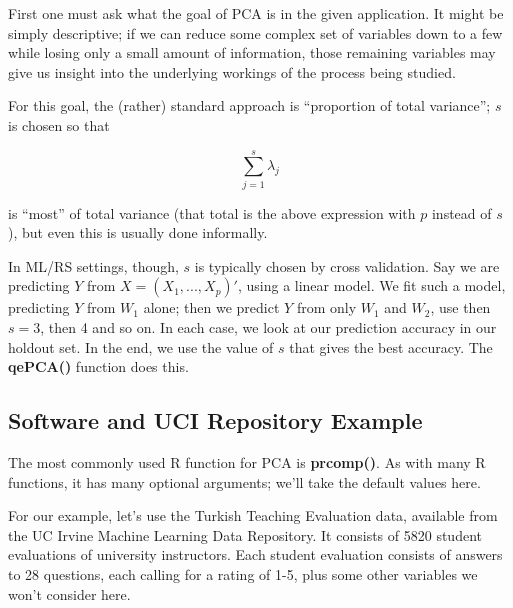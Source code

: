 First one must ask what the goal of PCA is in the given application.
It might be simply descriptive; if we can reduce some complex set of
variables down to a few while losing only a small amount of
information, those remaining variables may give us insight into the
underlying workings of the process being studied.

For this goal, the (rather) standard approach is ``proportion of total
variance''; $s$ is chosen so that 

\begin{equation} 
\sum_{j=1}^s \lambda_j
\end{equation}

is ``most'' of total variance (that total is the above expression
with $p$ instead of $s$), but even this is usually done informally.

In ML/RS settings, though, $s$ is typically chosen by 
cross validation.  Say we are predicting $Y$ from $X = (X_1,...,X_p)'$,
using a linear model.  We fit such a model, predicting $Y$
from $W_1$ alone; then we predict $Y$ from only $W_1$ and $W_2$,
use then $s = 3$, then 4 and so on.  In each case, we look at our
prediction accuracy in our holdout set.  In the end, we use the value of
$s$ that gives the best accuracy.  The \textbf{qePCA()} function does
this.


\subsection{Software and UCI Repository Example}

The most commonly used R function for PCA is \textbf{prcomp()}.  As with
many R functions, it has many optional arguments; we'll take the default
values here.

For our example, let's use the Turkish Teaching Evaluation data,
available from the UC Irvine Machine Learning Data Repository.  It
consists of 5820 student evaluations of university instructors.  Each
student evaluation consists of answers to 28 questions, each calling for
a rating of 1-5, plus some other variables we won't consider here.

